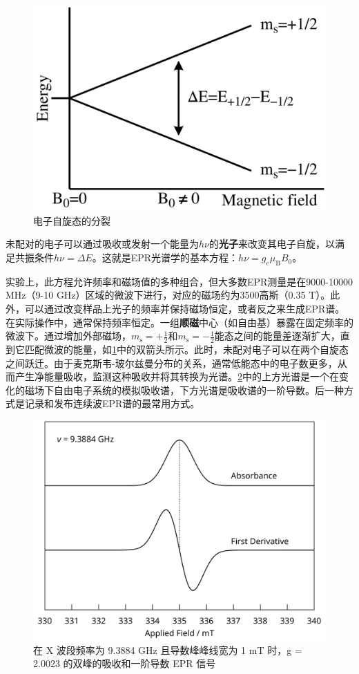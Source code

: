 \documentclass[dvipsnames, svgnames,a4paper,11pt]{article}
\begin{document}
\begin{enumerate}
		\begin{figure}[h!]
			\centering
			\includegraphics[width=0.5\linewidth]{images/EPR_splitting}
			\caption{电子自旋态的分裂}
			\label{fig:eprsplitting}
		\end{figure}
		
		未配对的电子可以通过吸收或发射一个能量为$h \nu$的\textbf{光子}来改变其电子自旋，以满足共振条件$h \nu = \Delta E$。这就是EPR光谱学的基本方程：$h \nu = g_e \mu_\text{B} B_0$。
		
		实验上，此方程允许频率和磁场值的多种组合，但大多数EPR测量是在9000-10000 MHz（9-10 GHz）区域的微波下进行，对应的磁场约为3500高斯（0.35 T）。此外，可以通过改变样品上光子的频率并保持磁场恒定，或者反之来生成EPR谱。在实际操作中，通常保持频率恒定。一组\textbf{顺磁}中心（如自由基）暴露在固定频率的微波下。通过增加外部磁场，$m_\mathrm{s} = + \tfrac{1}{2}$和$m_\mathrm{s} = - \tfrac{1}{2}$能态之间的能量差逐渐扩大，直到它匹配微波的能量，如\cref{fig:eprsplitting}中的双箭头所示。此时，未配对电子可以在两个自旋态之间跃迁。由于麦克斯韦-玻尔兹曼分布的关系，通常低能态中的电子数更多，从而产生净能量吸收，监测这种吸收并将其转换为光谱。\cref{fig:eprsignalharmonics}中的上方光谱是一个在变化的磁场下自由电子系统的模拟吸收谱，下方光谱是吸收谱的一阶导数。后一种方式是记录和发布连续波EPR谱的最常用方式。
		
		\begin{figure}[h!]
			\centering
			\includegraphics[width=0.5\linewidth]{images/EPR_Signal_Harmonics}
			\caption{在 X 波段频率为 9.3884 GHz 且导数峰峰线宽为 1 mT 时，g = 2.0023 的双峰的吸收和一阶导数 EPR 信号}
			\label{fig:eprsignalharmonics}
		\end{figure}
		

\end{enumerate}
\end{document}

